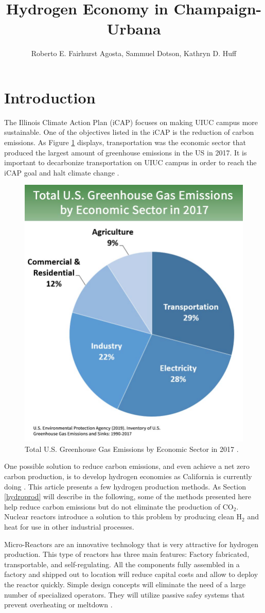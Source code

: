 \documentclass{anstrans}
\title{Hydrogen Economy in Champaign-Urbana}
\author{Roberto E. Fairhurst Agosta, Sammuel Dotson, Kathryn D. Huff}
\institute{
University of Illinois at Urbana-Champaign, Dept. of Nuclear, Plasma, and Radiological Engineering\\
ref3@illinois.edu
}
\begin{document}
\section{Introduction}

The Illinois Climate Action Plan (iCAP) focuses on making UIUC campus more sustainable. One of the objectives listed in the iCAP is the reduction of carbon emissions. As Figure \ref{fig:ghg} displays, transportation was the economic sector that produced the largest amount of greenhouse emissions in the US in 2017. It is important to decarbonize transportation on UIUC campus in order to reach the iCAP goal and halt climate change \cite{noauthor_illlinois_2015}.

\begin{figure}[H]
	\centering
	\includegraphics[width=0.4\linewidth]{figures/total-ghg-2019-caption.jpg}
	\hfill
	\caption{Total U.S. Greenhouse Gas Emissions by Economic Sector in 2017 \cite{us_epa_sources_2020}.}
	\label{fig:ghg}
\end{figure}

One possible solution to reduce carbon emissions, and even achieve a net zero carbon production, is to develop hydrogen economies as California is currently doing \cite{brown_economic_2013}. This article presents a few hydrogen production methods. As Section \ref{hydroprod} will describe in the following, some of the methods presented here help reduce carbon emissions but do not eliminate the production of CO$_2$. Nuclear reactors introduce a solution to this problem by producing clean H$_2$ and heat for use in other industrial processes.

Micro-Reactors are an innovative technology that is very attractive for hydrogen production. This type of reactors has three main features: Factory fabricated, transportable, and self-regulating. All the components fully assembled in a factory and shipped out to location will reduce capital costs and allow to deploy the reactor quickly. Simple design concepts will eliminate the need of a large number of specialized operators. They will utilize passive safey systems that prevent overheating or meltdown \cite{noauthor_ultimate_2019}.
\end{document}
